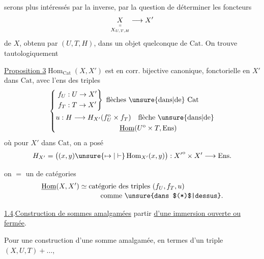  serons plus intéressés par la  inverse,
 par la question de déterminer les
foncteurs
\[
\underset{\substack{\shortparallel\\X_{U,T,H}}}{X}\longrightarrow X'
\]
de $X$, obtenu par $(U,T,H)$, dans un objet
quelconque de $\mathrm{Cat}$. On trouve tautologiquement

\uline{Proposition 3}\quad $\operatorname{Hom}_{\mathrm{Cat}}(X,X')$ est en corr. bijective
canonique, fonctorielle en $X'$ dans $\mathrm{Cat}$, avec
l'ens des triples
\[
\left\{\begin{aligned}
&\left.\begin{aligned}
f_U &: U\to X'\\
f_T &: T\to X'
\end{aligned}\right\}\ \text{flèches \unsure{dans|de} $\mathrm{Cat}$}\\
&u:H\longrightarrow H_{X'}(f_U^{\mathrm o}\times f_T)\quad\text{flèche \unsure{dans|de}}\\
&\hspace{9em}\underline{\operatorname{Hom}}(U^{\mathrm o}\times T,\mathrm{Ens})
\end{aligned}\right.
\]
où pour  $X'$ dans $\mathrm{Cat}$, on a posé
\[
H_{X'}=\bigl((x,y)\unsure{\mapsto|\vdash}\operatorname{Hom}_{X'}(x,y)\bigr):
{X'}^{\mathrm o}\times X'\longrightarrow\mathrm{Ens}.
\]

 on  $=$ un  de
catégories
\[
\begin{aligned}
\underline{\operatorname{Hom}}(X,X')&\simeq\text{catégorie des triples }(f_U,f_T,u)\\[-2pt]
&\hspace{3em}\text{comme \unsure{dans $(*)$|dessus}}.
\end{aligned}
\]

\uline{1.4}.\quad \uline{Construction de sommes amalgamées}  partir
\uline{d'une immersion ouverte ou fermée}.

Pour une construction d'une  somme
amalgamée, en termes d'un triple $(X,U,T)+\ldots$,
